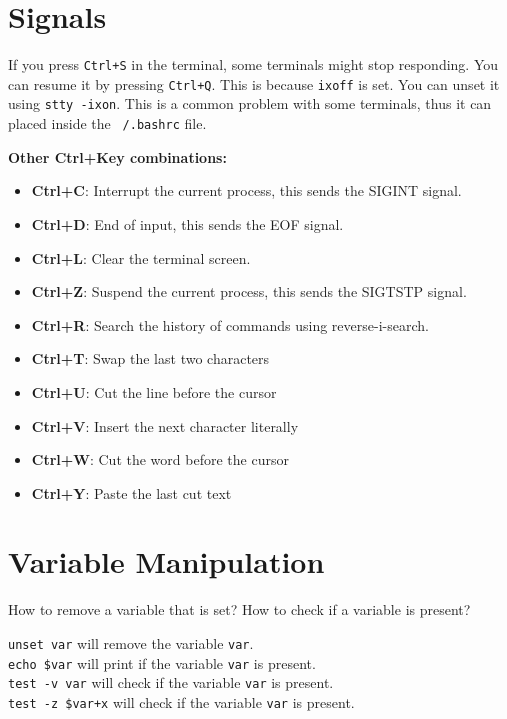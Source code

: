 \section{Signals}

\begin{remark}
  If you press \texttt{Ctrl+S} in the terminal, some terminals might
  stop responding. You can resume it by pressing \texttt{Ctrl+Q}.
  This is because \texttt{ixoff} is set. You can unset
  it using \texttt{stty -ixon}. This is a common problem with some
  terminals, thus it can placed inside the \texttt{~/.bashrc} file.
\end{remark}

\textbf{Other Ctrl+Key combinations:}
\begin{itemize}
  \item \textbf{Ctrl+C}: Interrupt the current process, this sends the SIGINT signal.
  \item \textbf{Ctrl+D}: End of input, this sends the EOF signal.
  \item \textbf{Ctrl+L}: Clear the terminal screen.
  \item \textbf{Ctrl+Z}: Suspend the current process, this sends the SIGTSTP signal.
  \item \textbf{Ctrl+R}: Search the history of commands using reverse-i-search.
  \item \textbf{Ctrl+T}: Swap the last two characters
  \item \textbf{Ctrl+U}: Cut the line before the cursor
  \item \textbf{Ctrl+V}: Insert the next character literally
  \item \textbf{Ctrl+W}: Cut the word before the cursor
  \item \textbf{Ctrl+Y}: Paste the last cut text
\end{itemize}
\section{Variable Manipulation}


\begin{qs}
  How to remove a variable that is set? How to check if a variable is present?
\end{qs}

\begin{ans}
  \texttt{unset var} will remove the variable \texttt{var}. \\
  \texttt{echo \$var} will print if the variable \texttt{var} is present.\\
  \texttt{test -v var} will check if the variable \texttt{var} is present.\\
  \texttt{test -z \${var+x}} will check if the variable \texttt{var} is present.\\
\end{ans}


